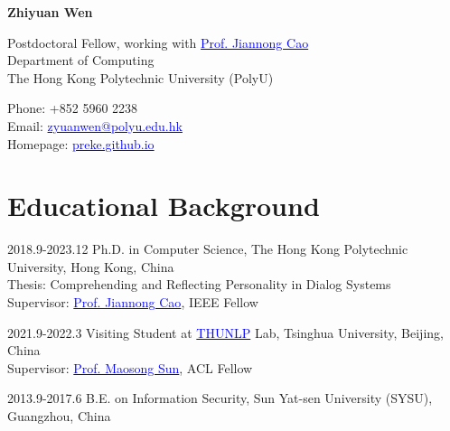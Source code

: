 \documentclass[12pt,letterpaper]{report}
\newcommand{\myname}{Zhiyuan Wen}
\newcommand{\namefont}[1]{{\normalfont\bfseries\Huge{#1}}}
\begin{document}
    \raggedright{}

    \namefont{\myname}

    \vspace{1em}
    \begin{minipage}[t]{0.670\textwidth}
        Postdoctoral Fellow, working with \href{https://www4.comp.polyu.edu.hk/~csjcao/}{\textcolor{blue}{Prof. Jiannong Cao}}\\
        Department of Computing\\
        The Hong Kong Polytechnic University (PolyU)
    \end{minipage}
    \begin{minipage}[t]{0.325\textwidth}
        \flushright{}
        Phone: +852 5960 2238\\
        Email: \href{mailto:zyuanwen@polyu.edu.hk}{\textcolor{blue}{zyuanwen@polyu.edu.hk}} \\
        Homepage: \href{https://preke.github.io}{\textcolor{blue}{preke.github.io}}\\
    \end{minipage}

    \section*{Educational Background}
    
    \begin{tablist}
      \item[2018.9-2023.12] \tab{}Ph.D. in Computer Science, The Hong Kong Polytechnic University, Hong Kong, China\\
      		Thesis: Comprehending and Reflecting Personality in Dialog Systems \\
      		Supervisor: \href{https://www4.comp.polyu.edu.hk/~csjcao/}{\textcolor{blue}{Prof. Jiannong Cao}}, IEEE Fellow \\
      \item[2021.9-2022.3] \tab{}Visiting Student at \href{https://nlp.csai.tsinghua.edu.cn/}{\textcolor{blue}{THUNLP}} Lab, Tsinghua University, Beijing, China\\
	      Supervisor: \href{https://nlp.csai.tsinghua.edu.cn/staff/sms/}{\textcolor{blue}{Prof. Maosong Sun}}, ACL Fellow \\
      \item[2013.9-2017.6] \tab{}B.E. on Information Security, Sun Yat-sen University (SYSU), Guangzhou, China 
    \end{tablist}
    
\end{document}
